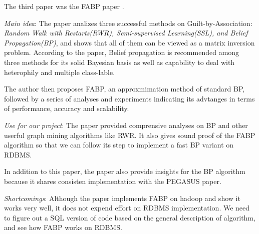 The third paper was the FABP paper \cite{koutra2011unifying}.
\begin{itemize*}
\item {\em Main idea}:
	   The paper analizes three successful methods on Guilt-by-Association: {\em Random Walk with Restarts(RWR), Semi-supervised Learning(SSL), and Belief Propagation(BP)}, and shows that all of them can be viewed as a matrix inversion problem. According to the paper, Belief propagation is recommended among three methods for its solid Bayesian basis as well as capability to deal with heterophily and multiple class-lable.

	   The author then proposes FABP, an approxmimation method of standard BP, followed by a series of analyses and experiments indicating its advtanges in terms of performance, accuracy and scalability. 
\item {\em Use for our project}:
	   The paper provided comprensive analyses on BP and other userful graph mining algorithms like RWR. It also gives sound proof of the FABP algorithm so that we can follow its step to implement a fast BP variant on RDBMS.

	   In addition to this paper, the paper \cite{KangCF11} also provide insights for the BP algorithm because it shares consisten implementation with the PEGASUS \cite{KangTF11} paper. 
\item {\em Shortcomings}:
       Although the paper implements FABP on hadoop and show it works very well, it does not expend effort on RDBMS implementation. We need to figure out a SQL version of code based on the general description of algorithm, and see how FABP works on RDBMS.		
\end{itemize*}

